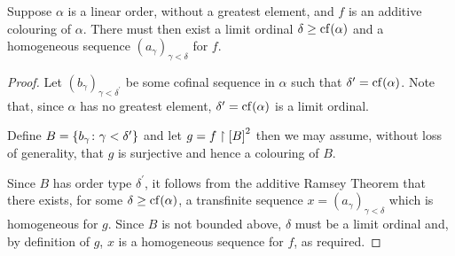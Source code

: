 \begin{cor}
	Suppose $\alpha$ is a linear order, without a greatest element, and $f$ is
	an additive colouring of $\alpha$. There must then exist a limit ordinal
	$\delta\geq\cf(\alpha)$ and a homogeneous sequence
	$(a_\gamma)_{\gamma<\delta}$ for $f$.
\end{cor}

\begin{proof}
	Let $(b_\gamma)_{\gamma<\delta^\prime}$ be some cofinal sequence in $\alpha$
	such that $\delta^\prime=\cf(\alpha)$.  Note that, since $\alpha$ has no
	greatest element, $\delta^\prime=\cf(\alpha)$ is a limit ordinal.

	Define $B=\setbuild{b_\gamma}{\gamma<\delta^\prime}$ and let
	$g=f\restriction{\subsets{2}{B}}$ then we may assume, without loss of
	generality, that $g$ is surjective and hence a colouring of $B$.

	Since $B$ has order type $\delta^\prime$, it follows from the additive
	Ramsey Theorem that there exists, for some $\delta\geq\cf(\alpha)$, a
	transfinite sequence $x=(a_\gamma)_{\gamma<\delta}$ which is homogeneous for
	$g$.  Since $B$ is not bounded above, $\delta$ must be a limit ordinal and,
	by definition of $g$, $x$ is a homogeneous sequence for $f$, as required.
\end{proof}



